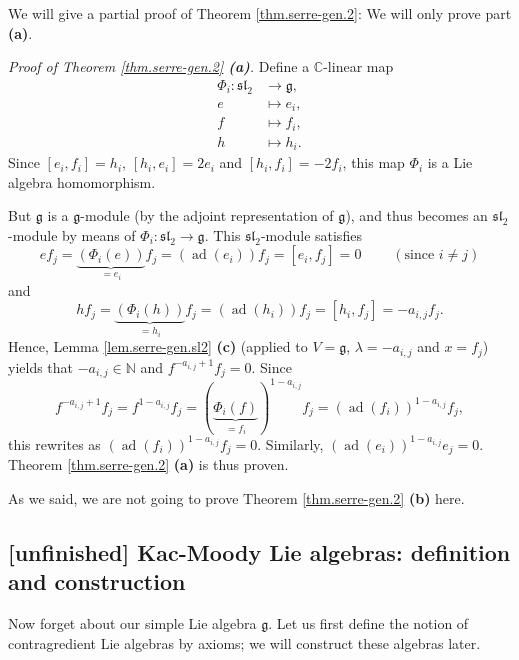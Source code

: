 \documentclass[etingof-lie.tex]{subfiles}
\begin{document}
We will give a partial proof of Theorem \ref{thm.serre-gen.2}: We will only
prove part \textbf{(a)}.

\textit{Proof of Theorem \ref{thm.serre-gen.2} \textbf{(a)}.} Define a
$\mathbb{C}$-linear map%
\begin{align*}
\Phi_{i}:\mathfrak{sl}_{2}  &  \rightarrow\mathfrak{g},\\
e  &  \mapsto e_{i},\\
f  &  \mapsto f_{i},\\
h  &  \mapsto h_{i}.
\end{align*}
Since $\left[  e_{i},f_{i}\right]  =h_{i}$, $\left[  h_{i},e_{i}\right]
=2e_{i}$ and $\left[  h_{i},f_{i}\right]  =-2f_{i}$, this map $\Phi_{i}$ is a
Lie algebra homomorphism.

But $\mathfrak{g}$ is a $\mathfrak{g}$-module (by the adjoint representation
of $\mathfrak{g}$), and thus becomes an $\mathfrak{sl}_{2}$-module by means of
$\Phi_{i}:\mathfrak{sl}_{2}\rightarrow\mathfrak{g}$. This $\mathfrak{sl}_{2}%
$-module satisfies%
\[
ef_{j}=\underbrace{\left(  \Phi_{i}\left(  e\right)  \right)  }_{=e_{i}}%
f_{j}=\left(  \operatorname*{ad}\left(  e_{i}\right)  \right)  f_{j}=\left[
e_{i},f_{j}\right]  =0\ \ \ \ \ \ \ \ \ \ \left(  \text{since }i\neq j\right)
\]
and%
\[
hf_{j}=\underbrace{\left(  \Phi_{i}\left(  h\right)  \right)  }_{=h_{i}}%
f_{j}=\left(  \operatorname*{ad}\left(  h_{i}\right)  \right)  f_{j}=\left[
h_{i},f_{j}\right]  =-a_{i,j}f_{j}.
\]
Hence, Lemma \ref{lem.serre-gen.sl2} \textbf{(c)} (applied to $V=\mathfrak{g}%
$, $\lambda=-a_{i,j}$ and $x=f_{j}$) yields that $-a_{i,j}\in\mathbb{N}$ and
$f^{-a_{i,j}+1}f_{j}=0$. Since%
\[
f^{-a_{i,j}+1}f_{j}=f^{1-a_{i,j}}f_{j}=\left(  \underbrace{\Phi_{i}\left(
f\right)  }_{=f_{i}}\right)  ^{1-a_{i,j}}f_{j}=\left(  \operatorname*{ad}%
\left(  f_{i}\right)  \right)  ^{1-a_{i,j}}f_{j},
\]
this rewrites as $\left(  \operatorname*{ad}\left(  f_{i}\right)  \right)
^{1-a_{i,j}}f_{j}=0$. Similarly, $\left(  \operatorname*{ad}\left(
e_{i}\right)  \right)  ^{1-a_{i,j}}e_{j}=0$. Theorem \ref{thm.serre-gen.2}
\textbf{(a)} is thus proven.

As we said, we are not going to prove Theorem \ref{thm.serre-gen.2}
\textbf{(b)} here.

\subsection{\textbf{[unfinished]} Kac-Moody Lie algebras: definition and
construction}

Now forget about our simple Lie algebra $\mathfrak{g}$. Let us first define
the notion of contragredient Lie algebras by axioms; we will construct these
algebras later.
\end{document}
